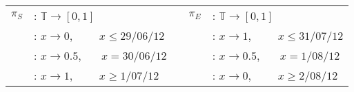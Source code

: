 \vspace{-10pt}
\begin{table}
\centering
\begin{tabular}{c l c c l}
$\pi_{S}$ & : $\mathbb{T} \rightarrow \left[0, 1\right]$ & \hspace{10pt} & $\pi_{E}$ & : $\mathbb{T} \rightarrow \left[0, 1\right]$ \\
 & : $x \rightarrow 0, \hspace{27pt} x \leq 29/06/12$ & & \hspace{10pt} & : $x \rightarrow 1, \hspace{27pt} x \leq 31/07/12$ \\
 & : $x \rightarrow 0.5, \hspace{20pt} x = 30/06/12$ & & \hspace{10pt} & : $x \rightarrow 0.5, \hspace{20pt} x = 1/08/12$ \\
 & : $x \rightarrow 1, \hspace{27pt} x \geq 1/07/12$ & & \hspace{10pt} & : $x \rightarrow 0, \hspace{27pt} x \geq 2/08/12$ \\


\end{tabular}
\label{tab:eqns}
\end{table}



